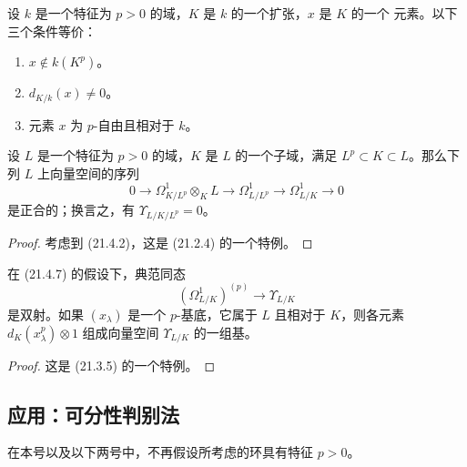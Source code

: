 \begin{corollary}[21.4.6]
\label{0.21.4.6-fr}
设 $k$ 是一个特征为 $p>0$ 的域，$K$ 是 $k$ 的一个扩张，$x$ 是 $K$ 的一个
元素。以下三个条件等价：
\begin{enumerate}
  \item[a)] $x\notin k(K^p)$。
  \item[b)] $d_{K/k}(x)\neq0$。
  \item[c)] 元素 $x$ 为 $p$-自由且相对于 $k$。
\end{enumerate}
\end{corollary}

\begin{proposition}[21.4.7]
\label{0.21.4.7-fr}
设 $L$ 是一个特征为 $p>0$ 的域，$K$ 是 $L$ 的一个子域，满足
$L^p\subset K\subset L$。那么下列 $L$ 上向量空间的序列
\begin{equation}
\tag{21.4.7.1}\label{0.21.4.7.1-fr}
0\to\Omega^1_{K/L^p}\otimes_KL\to\Omega^1_{L/L^p}
\to\Omega^1_{L/K}\to0
\end{equation}
是正合的；换言之，有 $\Upsilon_{L/K/L^p}=0$。
\end{proposition}
\begin{proof}
考虑到 (21.4.2)，这是 (21.2.4) 的一个特例。
\end{proof}

\begin{proposition}[21.4.8]
\label{0.21.4.8-fr}
在 (21.4.7) 的假设下，典范同态
\begin{equation}
\tag{21.4.8.1}\label{0.21.4.8.1-fr}
(\Omega^1_{L/K})^{(p)}\longrightarrow\Upsilon_{L/K}
\end{equation}
是双射。如果 $(x_\lambda)$ 是一个 $p$-基底，它属于 $L$ 且相对于 $K$，则各元素
$d_K(x_\lambda^p)\otimes1$ 组成向量空间 $\Upsilon_{L/K}$ 的一组基。
\end{proposition}
\begin{proof}
这是 (21.3.5) 的一个特例。
\end{proof}

\subsection{应用：可分性判别法}
\label{0.21.5-fr}

在本号以及以下两号中，不再假设所考虑的环具有特征 $p>0$。

